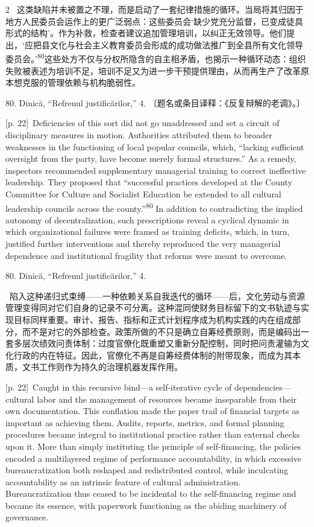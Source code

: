 \documentclass[10pt,a4paper]{article}
\begin{document}
\begin{paracol}{2}
\switchcolumn*
{\scriptsize\color{gray} [p. 22]}\ 这类缺陷并未被置之不理，而是启动了一套纪律措施的循环。当局将其归因于地方人民委员会运作上的更广泛弱点：这些委员会‘缺少党充分监督，已变成徒具形式的结构’。作为补救，检查者建议追加管理培训，以纠正无效领导。他们提出，‘应把县文化与社会主义教育委员会形成的成功做法推广到全县所有文化领导委员会。’\nobreak\textsuperscript{80}这些处方不仅与分权所隐含的自主相矛盾，也揭示一种循环动态：组织失败被表述为培训不足，培训不足又为进一步干预提供理由，从而再生产了改革原本想克服的管理依赖与机构脆弱性。\par{\small 80. Dinică, “Refrenul justificărilor,” 4. 〔题名或条目译释：《反复辩解的老调》。〕\par}
\switchcolumn
{\scriptsize\color{gray} [p. 22]}\ Deficiencies of this sort did not go unaddressed and set a circuit of disciplinary measures in motion. Authorities attributed them to broader weaknesses in the functioning of local popular councils, which, “lacking sufficient oversight from the party, have become merely formal structures.” As a remedy, inspectors recommended supplementary managerial training to correct ineffective leadership. They proposed that “successful practices developed at the County Committee for Culture and Socialist Education be extended to all cultural leadership councils across the county.”\nobreak\textsuperscript{80} In addition to contradicting the implied autonomy of decentralization, such prescriptions reveal a cyclical dynamic in which organizational failures were framed as training deficits, which, in turn, justified further interventions and thereby reproduced the very managerial dependence and institutional fragility that reforms were meant to overcome.\par{\small 80. Dinică, “Refrenul justificărilor,” 4.\par}
\switchcolumn*
{\scriptsize\color{gray} [p. 22]}\ 陷入这种递归式束缚——一种依赖关系自我迭代的循环——后，文化劳动与资源管理变得同对它们自身的记录不可分离。这种混同使财务目标留下的文书轨迹与实现目标同样重要。审计、报告、指标和正式计划程序成为机构实践的内在组成部分，而不是对它的外部检查。政策所做的不只是确立自筹经费原则，而是编码出一套多层次绩效问责体制：过度官僚化既重塑又重新分配控制，同时把问责灌输为文化行政的内在特征。因此，官僚化不再是自筹经费体制的附带现象，而成为其本质，文书工作则作为持久的治理机器发挥作用。\par
\switchcolumn
{\scriptsize\color{gray} [p. 22]}\ Caught in this recursive bind—a self-iterative cycle of dependencies—cultural labor and the management of resources became inseparable from their own documentation. This conflation made the paper trail of financial targets as important as achieving them. Audits, reports, metrics, and formal planning procedures became integral to institutional practice rather than external checks upon it. More than simply instituting the principle of self-financing, the policies encoded a multilayered regime of performance accountability, in which excessive bureaucratization both reshaped and redistributed control, while inculcating accountability as an intrinsic feature of cultural administration. Bureaucratization thus ceased to be incidental to the self-financing regime and became its essence, with paperwork functioning as the abiding machinery of governance.\par

\end{paracol}
\end{document}
